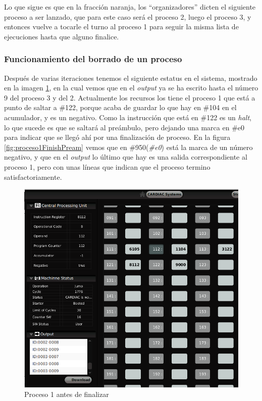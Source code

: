 \documentclass[letterpaper,12pt,oneside]{book}
\begin{document}
		
		Lo que sigue es que en la fracción naranja, los ``organizadores'' dicten el siguiente proceso a ser lanzado, que para este caso será el proceso 2, luego
		el proceso 3, y entonces vuelve a tocarle el turno al proceso 1 para seguir la misma lista de ejecuciones hasta que alguno finalice.
		
		
		\subsubsection{Funcionamiento del borrado de un proceso}
		
		Después de varias iteraciones tenemos el siguiente estatus en el sistema, mostrado en la imagen \ref{fig:proceso1BeforeFinish}, en la cual vemos que en el
		\textit{output} ya se ha escrito hasta el número 9 del proceso 3 y del 2. Actualmente los recursos los tiene el proceso 1 que está a 
		punto de saltar a \#122, porque acaba de guardar lo que hay en \#104 en el acumulador, y es un negativo. Como la instrucción que está en \#122 es un \textit{halt}, lo que sucede es que se saltará
		al preámbulo, pero dejando una marca en \#e0 para indicar que se llegó ahí por una finalización de proceso. En la figura \ref{fig:proceso1FinishPream}
		vemos que en \#950(\textit{\#e0}) está la marca de un número negativo, y que en el \textit{output} lo último que hay es una salida correspondiente al
		proceso 1, pero con unas líneas que indican que el proceso termino satisfactoriamente.
		
		\begin{figure}[h]		
			\centering
			\includegraphics[scale=0.4]{media/CARDIACC/proceso1BeforeFinish_cutted.png}
			\caption{ Proceso 1 antes de finalizar }
			\label{fig:proceso1BeforeFinish}
		\end{figure}
		
\end{document}

